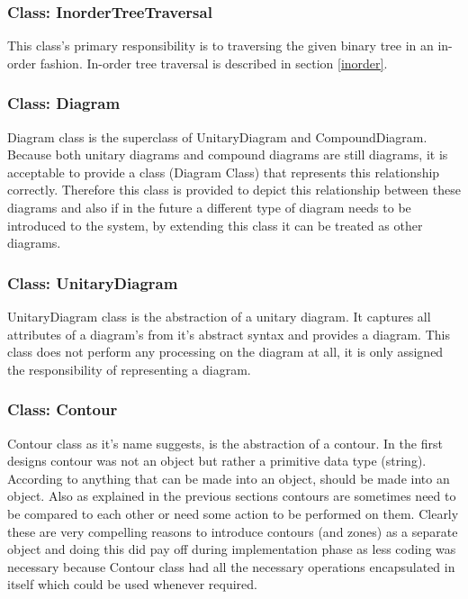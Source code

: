 \documentclass[10pt, a4paper, titlepage]{article}
\begin{document}

\subsubsection{Class: InorderTreeTraversal}
This class's primary responsibility is to traversing the given binary tree in an in-order fashion. In-order tree traversal is described in section \ref{inorder}.

\subsubsection{Class: Diagram}
Diagram class is the superclass of UnitaryDiagram and CompoundDiagram. Because both unitary diagrams and compound diagrams are still diagrams, it is acceptable to provide a class (Diagram Class) that represents this relationship correctly. Therefore this class is provided to depict this relationship between these diagrams and also if in the future a different type of diagram needs to be introduced to the system, by extending this class it can be treated as other diagrams.
 
\subsubsection{Class: UnitaryDiagram}
UnitaryDiagram class is the abstraction of a unitary diagram. It captures all attributes of a diagram's from it's abstract syntax and provides a diagram. This class does not perform any processing on the diagram at all, it is only assigned the responsibility of representing a diagram.

\subsubsection{Class: Contour}
Contour class as it's  name suggests, is the abstraction of a contour. In the first designs contour was not an object but rather a primitive data type (string). According to \cite{Larman_book} anything that can be made into an object, should be made into an object. Also as explained in the previous sections contours are sometimes need to be compared to each other or need some action to be performed on them. Clearly these are very compelling reasons to introduce contours (and zones) as a separate object and doing this did pay off during implementation phase as less coding was necessary because Contour class had all the necessary operations encapsulated in itself which could be used whenever required.
  
\end{document}
